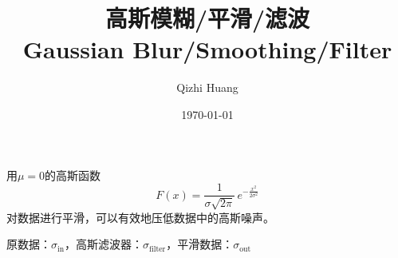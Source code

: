 \documentclass[11pt, a4paper]{article}  %
\begin{document}
\begin{CJK}{UTF8}{gbsn}  %
\nocite{*}
\setlength{\parskip}{6pt}  %
\setlength{\baselineskip}{20pt} %





\title{\huge 高斯模糊/平滑/滤波\\Gaussian Blur/Smoothing/Filter \bf }

\author{Qizhi Huang}
\date{\today}
\maketitle



用$\mu=0$的高斯函数
\begin{equation}
	F(x) = \frac{1}{\sigma \sqrt{2\pi}} \, e^{-\frac{x^2}{2\sigma^2}}
\end{equation}
对数据进行平滑，可以有效地压低数据中的高斯噪声。

原数据：$\sigma_{\text{in}}$，高斯滤波器：$\sigma_{\text{filter}}$，平滑数据：$\sigma_{\text{out}}$


\end{CJK}
\end{document}
